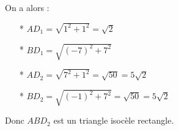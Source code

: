 On a alors : 
\\
\begin{itemize}
\item [*] $ AD_1 = \sqrt{1^2 + 1^2} = \sqrt{2} $\\
\item [*] $ BD_1 = \sqrt{\left(-7\right)^2 + 7^2} $\\
\item [*] $ AD_2 = \sqrt{7^2 + 1^2} = \sqrt{50} = 5\sqrt{2} $\\
\item [*] $ BD_2 = \sqrt{\left(-1\right)^2 + 7^2} = \sqrt{50} = 5\sqrt{2} $\\
\end{itemize}

Donc $ABD_2$ est un triangle isocèle rectangle.

% 
